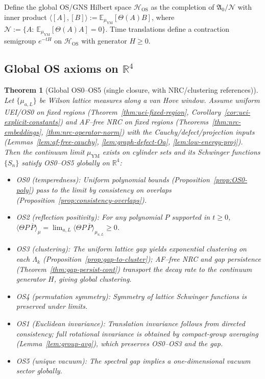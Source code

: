 \documentclass[11pt]{amsart}
\theoremstyle{plain}
\newtheorem{theorem}{Theorem}[section]
\theoremstyle{definition}
\theoremstyle{remark}
\begin{document}
Define the global OS/GNS Hilbert space $\mathcal H_{\mathrm{OS}}$ as the completion of $\mathfrak A_0/\mathcal N$ with inner product $\langle [A],[B]\rangle:=\mathbb E_{\mu_{\mathrm{YM}}}[\Theta(A)B]$, where $\mathcal N:=\{A:\ \mathbb E_{\mu_{\mathrm{YM}}}[\Theta(A)A]=0\}$. Time translations define a contraction semigroup $e^{-tH}$ on $\mathcal H_{\mathrm{OS}}$ with generator $H\ge 0$.

\subsection{Global OS axioms on $\mathbb R^4$}

\begin{theorem}[Global OS0--OS5 (single closure, with NRC/clustering references)]\label{thm:global-OS}
Let $\{\mu_{a,L}\}$ be Wilson lattice measures along a van Hove window. Assume uniform UEI/OS0 on fixed regions (Theorem~\ref{thm:uei-fixed-region}, Corollary~\ref{cor:uei-explicit-constants}) and AF--free NRC on fixed regions (Theorems~\ref{thm:nrc-embeddings}, \ref{thm:nrc-operator-norm}) with the Cauchy/defect/projection inputs (Lemmas~\ref{lem:af-free-cauchy}, \ref{lem:graph-defect-Oa}, \ref{lem:low-energy-proj}). Then the continuum limit $\mu_{\mathrm{YM}}$ exists on cylinder sets and its Schwinger functions $\{S_n\}$ satisfy OS0--OS5 globally on $\mathbb R^4$:
\begin{itemize}
  \item OS0 (temperedness): Uniform polynomial bounds (Proposition~\ref{prop:OS0-poly}) pass to the limit by consistency on overlaps (Proposition~\ref{prop:consistency-overlaps}).
  \item OS2 (reflection positivity): For any polynomial $P$ supported in $t\ge 0$, $\langle\Theta P\,\overline{P}\rangle_{\mu}=\lim_{a,L}\langle\Theta P\,\overline{P}\rangle_{\mu_{a,L}}\ge 0$.
  \item OS3 (clustering): The uniform lattice gap yields exponential clustering on each $\Lambda_k$ (Proposition~\ref{prop:gap-to-cluster}); AF--free NRC and gap persistence (Theorem~\ref{thm:gap-persist-cont}) transport the decay rate to the continuum generator $H$, giving global clustering.
  \item OS4 (permutation symmetry): Symmetry of lattice Schwinger functions is preserved under limits.
  \item OS1 (Euclidean invariance): Translation invariance follows from directed consistency; full rotational invariance is obtained by compact-group averaging (Lemma~\ref{lem:group-avg}), which preserves OS0--OS3 and the gap.
  \item OS5 (unique vacuum): The spectral gap implies a one-dimensional vacuum sector globally.
\end{itemize}
\end{theorem}
\end{document}
